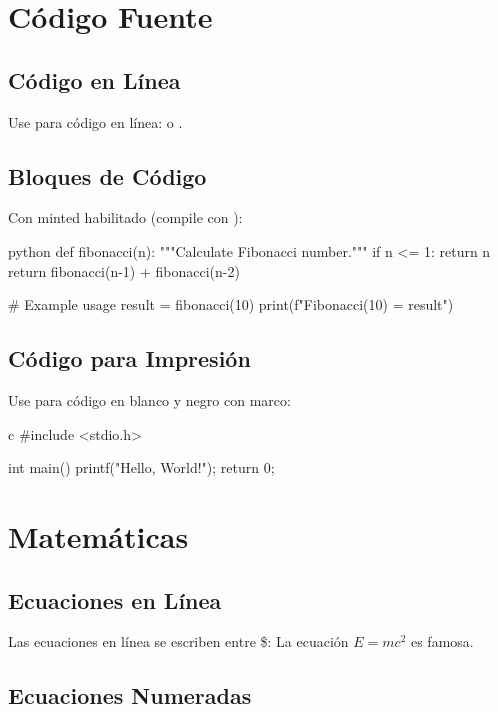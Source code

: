 \documentclass{pt-article}
\begin{document}
\section{Código Fuente}

\subsection{Código en Línea}

Use  para código en línea:
 o .

\subsection{Bloques de Código}

Con minted habilitado (compile con ):

\begin{ptprintcode}{python}
def fibonacci(n):
    """Calculate Fibonacci number."""
    if n <= 1:
        return n
    return fibonacci(n-1) + fibonacci(n-2)

# Example usage
result = fibonacci(10)
print(f"Fibonacci(10) = {result}")
\end{ptprintcode}

\subsection{Código para Impresión}

Use  para código en blanco y negro con marco:

\begin{ptprintcode}{c}
#include <stdio.h>

int main() {
    printf("Hello, World!\n");
    return 0;
}
\end{ptprintcode}

\section{Matemáticas}

\subsection{Ecuaciones en Línea}

Las ecuaciones en línea se escriben entre \$: La ecuación $E = mc^2$ es famosa.

\subsection{Ecuaciones Numeradas}
\end{document}
